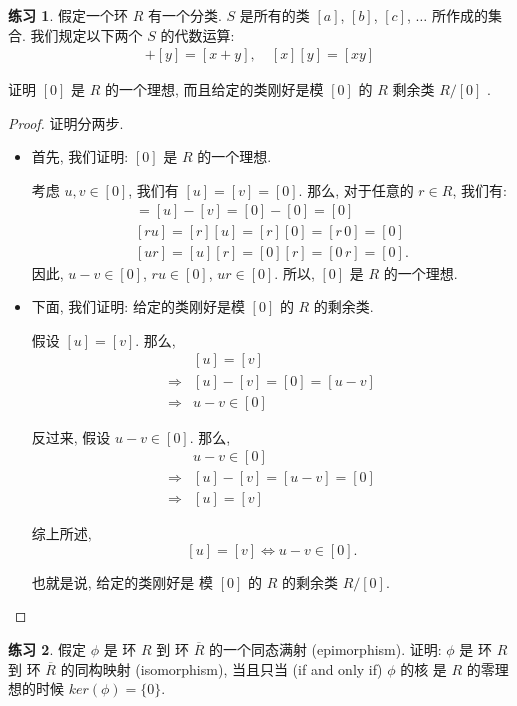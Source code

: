 \documentclass[utf8]{ctexbook}
\theoremstyle{definition}
\newtheorem{exercise}{练习}[section]
\begin{document}
\begin{exercise}
假定一个环 $R$ 有一个分类. $S$ 是所有的类 $[a]$, $[b]$, $[c]$, $\ldots$ 所作成的集合. 我们规定以下两个 $S$ 的代数运算:
\begin{align*}
[x] +[y] =[x+y], \quad [x][y] = [xy]
\end{align*}

证明 $[0]$ 是 $R$ 的一个理想, 而且给定的类刚好是模 $[0]$ 的 $R$ 剩余类 $R/[0]$ .
\end{exercise}

\begin{proof}

证明分两步.

\begin{itemize}
\item{首先, 我们证明: $[0]$ 是 $R$ 的一个理想.

考虑 $u, v \in [0]$, 我们有 $[u] =[v] =[0]$. 那么, 对于任意的 $r \in R$, 我们有:
\begin{align*}
[u-v] = [u] -[v] = [0] - [0] = [0] \\
[ru] = [r] [u] = [r] [0] = [r \, 0] = [0] \\
[u r] = [u][r] = [0] [r] = [0 \, r] =  [0] .
\end{align*}
因此, $u - v \in [0]$, $r u \in [0]$, $u r \in [0]$. 所以, $[0]$ 是 $R$ 的一个理想.
}
\item{下面, 我们证明: 给定的类刚好是模 $[0]$ 的 $R$ 的剩余类.

假设 $[u] =[v]$. 那么, 
\begin{align*}
& [u] = [v] \\
\Longrightarrow  & [u] - [v] = [0] = [u-v] \\
\Longrightarrow& u - v \in [0] 
\end{align*}

反过来, 假设 $u - v \in [0]$. 那么,
\begin{align*}
& u - v \in [0] \\
\Longrightarrow & [u] - [v] = [u-v] = [0] \\
\Longrightarrow & [u] = [v]
\end{align*}

综上所述, 
$$[u] = [v] \iff u - v \in [0]. $$

也就是说, 给定的类刚好是 模 $[0]$ 的 $R$ 的剩余类 $R/[0]$.
}
\end{itemize}

\end{proof}

\begin{exercise}
假定 $\phi$ 是 环 $R$ 到 环 $\overline{R}$ 的一个同态满射 (epimorphism). 证明: $\phi$ 是 环 $R$ 到 环 $\overline{R}$ 的同构映射 (isomorphism), 当且只当 (if and only if) $\phi$ 的核 是 $R$ 的零理想的时候 $ker(\phi) = \{ 0\}$.
\end{exercise}
\end{document}

